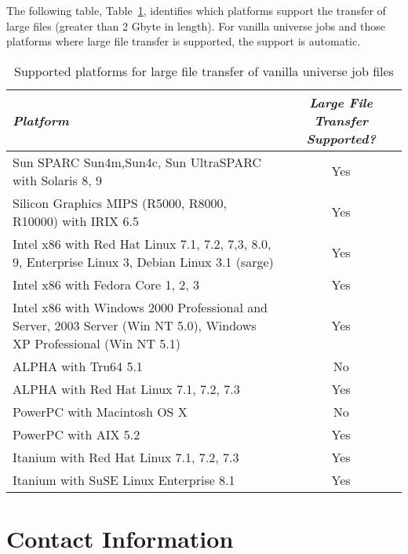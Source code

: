 The following table, 
Table~\ref{large-file-support},
identifies which platforms support
the transfer of large files (greater than 2 Gbyte in length).
For vanilla universe jobs and those platforms where large file transfer is
supported, the support is automatic.

\begin{center}
\begin{table}[hbt]
\begin{tabular}{|lc|} \hline
\emph{Platform} & \emph{Large File Transfer Supported?} \\ \hline \hline
Sun SPARC Sun4m,Sun4c, Sun UltraSPARC with Solaris 8, 9 & Yes \\ \hline
Silicon Graphics MIPS (R5000, R8000, R10000) with IRIX 6.5 &  Yes \\ \hline
Intel x86 with Red Hat Linux 7.1, 7.2, 7,3, 8.0, 9, Enterprise Linux 3, Debian Linux 3.1 (sarge) & Yes \\ 
Intel x86 with Fedora Core 1, 2, 3 & Yes \\
Intel x86 with Windows 2000 Professional and Server, 2003 Server (Win NT 5.0), Windows XP Professional (Win NT 5.1) & Yes \\ \hline
ALPHA with  Tru64 5.1  & No \\ 
ALPHA with Red Hat Linux 7.1, 7.2, 7.3 & Yes \\ \hline
PowerPC with Macintosh OS X  & No \\
PowerPC with AIX 5.2  & Yes \\ \hline
Itanium with Red Hat Linux 7.1, 7.2, 7.3 & Yes \\
Itanium with SuSE Linux Enterprise 8.1 & Yes \\ \hline
\end{tabular}
\caption{\label{large-file-support}Supported platforms for large file transfer of vanilla universe job files}
\end{table}
\end{center}


 


\section{\label{contact-info}Contact Information}

